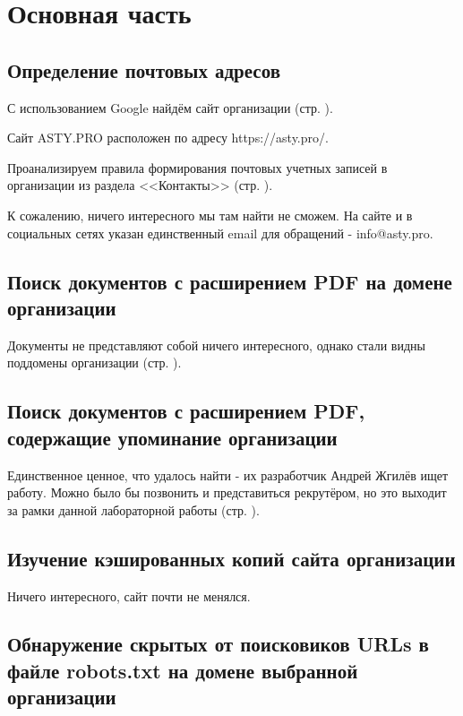 \chapter{Основная часть}

\section{Определение почтовых адресов}

С использованием Google найдём сайт организации (стр. \pageref{asty}).

Сайт ASTY.PRO расположен по адресу https://asty.pro/.

Проанализируем правила формирования почтовых учетных записей в организации из раздела <<Контакты>> (стр. \pageref{contacts}).


К сожалению, ничего интересного мы там найти не сможем. На сайте и в социальных сетях указан единственный email для обращений - info@asty.pro.

\section{Поиск документов с расширением PDF на домене организации}

Документы не представляют собой ничего интересного, однако стали видны поддомены организации (стр. \pageref{docs}).


\section{Поиск документов с расширением PDF, содержащие упоминание организации}

Единственное ценное, что удалось найти - их разработчик Андрей Жгилёв ищет работу. Можно было бы позвонить и представиться рекрутёром, но это выходит за рамки данной лабораторной работы (стр. \pageref{mime_pdf}).

\section{Изучение кэшированных копий сайта организации}

Ничего интересного, сайт почти не менялся.

\section{Обнаружение скрытых от поисковиков URLs в файле robots.txt на домене выбранной организации}


